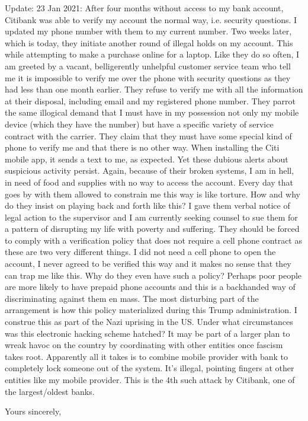 \documentclass[a4paper]{arthur-letter}
\begin{document}
\begin{letter}
    Update: 23 Jan 2021: After four months without access to my bank account, Citibank was able to verify my account the normal way, i.e. security questions. I updated my phone number with them to my current number. Two weeks later, which is today, they initiate another round of illegal holds on my account. This while attempting to make a purchase online for a laptop. Like they do so often, I am greeted by a vacant, belligerently unhelpful customer service team who tell me it is impossible to verify me over the phone with security questions as they had less than one month earlier. They refuse to verify me with all the information at their disposal, including email and my registered phone number. They parrot the same illogical demand that I must have in my possession not only my mobile device (which they have the number) but have a specific variety of service contract with the carrier. They claim that they must have some special kind of phone to verify me and that there is no other way. When installing the Citi mobile app, it sends a text to me, as expected. Yet these dubious alerts about suspicious activity persist. Again, because of their broken systems, I am in hell, in need of food and supplies with no way to access the account. Every day that goes by with them allowed to constrain me this way is like torture. How and why do they insist on playing back and forth like this? I gave them verbal notice of legal action to the supervisor and I am currently seeking counsel to sue them for a pattern of disrupting my life with poverty and suffering. They should be forced to comply with a verification policy that does not require a cell phone contract as these are two very different things. I did not need a cell phone to open the account, I never agreed to be verified this way and it makes no sense that they can trap me like this. Why do they even have such a policy? Perhaps poor people are more likely to have prepaid phone accounts and this is a backhanded way of discriminating against them en mass. The most disturbing part of the arrangement is how this policy materialized during this Trump administration. I construe this as part of the Nazi uprising in the US. Under what circumstances was this electronic hacking scheme hatched? It may be part of a larger plan to wreak havoc on the country by coordinating with other entities once fascism takes root. Apparently all it takes is to combine mobile provider with bank to completely lock someone out of the system. It's illegal, pointing fingers at other entities like my mobile provider. This is the 4th such attack by Citibank, one of the largest/oldest banks.
    
            
            \closing{Yours sincerely,} %


    \end{letter}
    
\end{document}
